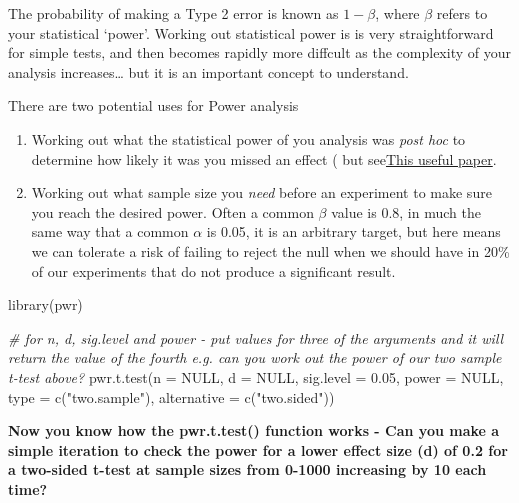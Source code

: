 \documentclass[
]{book}
\newenvironment{Shaded}{\begin{snugshade}}{\end{snugshade}}
\newcommand{\AttributeTok}[1]{\textcolor[rgb]{0.77,0.63,0.00}{#1}}
\newcommand{\CommentTok}[1]{\textcolor[rgb]{0.56,0.35,0.01}{\textit{#1}}}
\newcommand{\ConstantTok}[1]{\textcolor[rgb]{0.00,0.00,0.00}{#1}}
\newcommand{\FloatTok}[1]{\textcolor[rgb]{0.00,0.00,0.81}{#1}}
\newcommand{\FunctionTok}[1]{\textcolor[rgb]{0.00,0.00,0.00}{#1}}
\newcommand{\NormalTok}[1]{#1}
\newcommand{\StringTok}[1]{\textcolor[rgb]{0.31,0.60,0.02}{#1}}
\begin{document}
The probability of making a Type 2 error is known as \(1-\beta\), where \(\beta\) refers to your statistical `power'. Working out statistical power is is very straightforward for simple tests, and then becomes rapidly more diffcult as the complexity of your analysis increases\ldots{} but it is an important concept to understand.

There are two potential uses for Power analysis

\begin{enumerate}
\def\labelenumi{\arabic{enumi})}
\item
  Working out what the statistical power of you analysis was \emph{post hoc} to determine how likely it was you missed an effect ( but see\href{https://gpsych.bmj.com/content/32/4/e100069}{This useful paper}.
\item
  Working out what sample size you \emph{need} before an experiment to make sure you reach the desired power. Often a common \(\beta\) value is 0.8, in much the same way that a common \(\alpha\) is 0.05, it is an arbitrary target, but here means we can tolerate a risk of failing to reject the null when we should have in 20\% of our experiments that do not produce a significant result.
\end{enumerate}

\begin{Shaded}
\begin{Highlighting}[]
\FunctionTok{library}\NormalTok{(pwr)}

\CommentTok{\# for n, d, sig.level and power {-} put values for three of the arguments and it will return the value of the fourth e.g. can you work out the power of our two sample t{-}test above? }
\FunctionTok{pwr.t.test}\NormalTok{(}\AttributeTok{n =} \ConstantTok{NULL}\NormalTok{, }\AttributeTok{d =} \ConstantTok{NULL}\NormalTok{, }\AttributeTok{sig.level =} \FloatTok{0.05}\NormalTok{, }\AttributeTok{power =} \ConstantTok{NULL}\NormalTok{,}
\AttributeTok{type =} \FunctionTok{c}\NormalTok{(}\StringTok{"two.sample"}\NormalTok{),}
\AttributeTok{alternative =} \FunctionTok{c}\NormalTok{(}\StringTok{"two.sided"}\NormalTok{))}
\end{Highlighting}
\end{Shaded}

\textbf{Now you know how the pwr.t.test() function works - Can you make a simple iteration to check the power for a lower effect size (d) of 0.2 for a two-sided t-test at sample sizes from 0-1000 increasing by 10 each time?}
\end{document}
